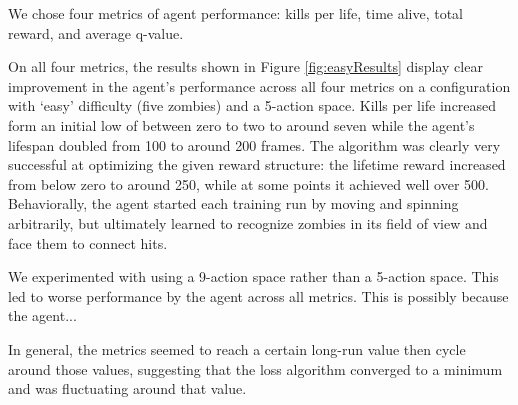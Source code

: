 \documentclass{article}
\begin{document}
\begin{multicols}{2}
We chose four metrics of agent performance: kills per life, time alive, total reward, and average q-value.

On all four metrics, the results shown in Figure \ref{fig:easyResults} display clear improvement in the agent's performance across all four metrics on a configuration with `easy' difficulty (five zombies) and a 5-action space.
Kills per life increased form an initial low of between zero to two to around seven while the agent's lifespan doubled from 100 to around 200 frames. The algorithm was clearly very successful at optimizing the given reward structure: the lifetime reward increased from below zero to around 250, while at some points it achieved well over 500. Behaviorally, the agent started each training run by moving and spinning arbitrarily, but ultimately learned to recognize zombies in its field of view and face them to connect hits.

We experimented with using a 9-action space rather than a 5-action space. This led to worse performance by the agent across all metrics. This is possibly because the agent...

In general, the metrics seemed to reach a certain long-run value then cycle around those values, suggesting that the loss algorithm converged to a minimum and was fluctuating around that value.


\end{multicols}
\end{document}

